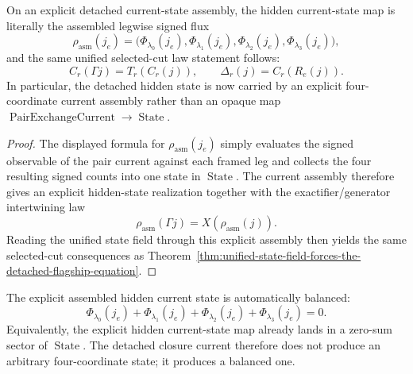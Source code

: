\begin{theorem}
\label{thm:explicit-current-state-assembly-forces-the-unified-flagship-surface}
On an explicit detached current-state assembly, the hidden current-state map is
literally the assembled legwise signed flux
\[
\rho_{\mathrm{asm}}(j_e)
=
\bigl(
\Phi_{\lambda_0}(j_e),
\Phi_{\lambda_1}(j_e),
\Phi_{\lambda_2}(j_e),
\Phi_{\lambda_3}(j_e)
\bigr),
\]
and the same unified selected-cut law statement follows:
\[
C_r(\Gamma j)=T_r(C_r(j)),
\qquad
\Delta_r(j)=C_r(R_e(j)).
\]
In particular, the detached hidden state is now carried by an explicit
four-coordinate current assembly rather than an opaque map
\(\operatorname{PairExchangeCurrent}\to\operatorname{State}\).
\end{theorem}

\begin{proof}
The displayed formula for \(\rho_{\mathrm{asm}}(j_e)\) simply evaluates the
signed observable of the pair current against each framed leg and collects the
four resulting signed counts into one state in \(\operatorname{State}\). The
current assembly therefore gives an explicit hidden-state realization together
with the exactifier/generator intertwining law
\[
\rho_{\mathrm{asm}}(\Gamma j)=X(\rho_{\mathrm{asm}}(j)).
\]
Reading the unified state field through this explicit assembly then yields the
same selected-cut consequences as
Theorem~\ref{thm:unified-state-field-forces-the-detached-flagship-equation}.
\end{proof}

\begin{theorem}
\label{thm:explicit-current-assembly-is-balanced}
The explicit assembled hidden current state is automatically balanced:
\[
\Phi_{\lambda_0}(j_e)+
\Phi_{\lambda_1}(j_e)+
\Phi_{\lambda_2}(j_e)+
\Phi_{\lambda_3}(j_e)=0.
\]
Equivalently, the explicit hidden current-state map already lands in a
zero-sum sector of \(\operatorname{State}\). The detached closure current
therefore does not produce an arbitrary four-coordinate state; it produces a
balanced one.
\end{theorem}

